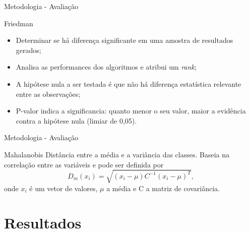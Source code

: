 \documentclass{beamer}
\begin{document}
\begin{frame}{Metodologia - Avaliação}
\setlength\leftmargini{1em}
\begin{block}{Friedman}
\begin{itemize}
\item Determinar se há diferença significante em uma amostra de resultados gerados;
\item Analisa as performances dos algoritmos e atribui um \textit{rank};
\item A hipótese nula a ser testada é que não há diferença estatística relevante entre as observações;
\item P-valor indica a significancia: quanto menor o seu valor, maior a evidência contra a hipótese nula (limiar de 0,05).
\end{itemize}
\end{block}
\end{frame}
\begin{frame}{Metodologia - Avaliação}
\justifying
\setlength\leftmargini{1em}
\begin{block}{Mahalanobis}  %
Distância entre a média e a variância das classes. Baseia na correlação entre as variáveis e pode ser definida por
\begin{equation*}
  D_m(x_i) = \sqrt{(x_i - \mu)C^{-1}(x_i-\mu)^T},
\end{equation*}
\noindent onde $x_i$ é um vetor de valores, $\mu$ a média e C a matriz de covariância.
\end{block}
\end{frame}
\section{Resultados}
\end{document}

